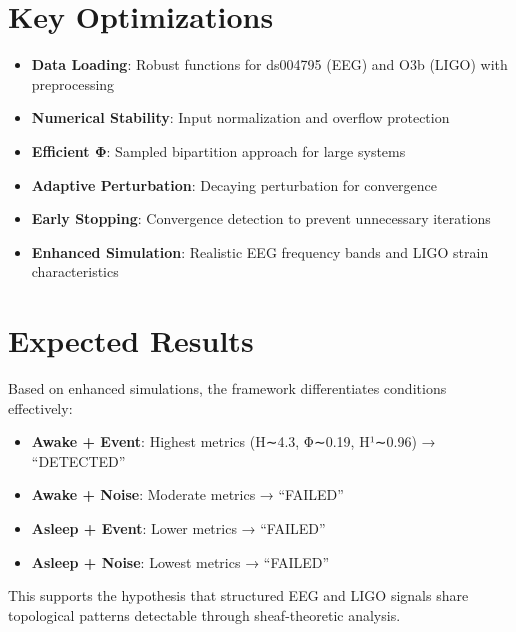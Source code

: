 \documentclass[11pt]{article}
\begin{document}
\section{Key Optimizations}

\begin{itemize}
\item \textbf{Data Loading}: Robust functions for ds004795 (EEG) and O3b (LIGO) with preprocessing
\item \textbf{Numerical Stability}: Input normalization and overflow protection
\item \textbf{Efficient Φ}: Sampled bipartition approach for large systems
\item \textbf{Adaptive Perturbation}: Decaying perturbation for convergence
\item \textbf{Early Stopping}: Convergence detection to prevent unnecessary iterations
\item \textbf{Enhanced Simulation}: Realistic EEG frequency bands and LIGO strain characteristics
\end{itemize}

\section{Expected Results}

Based on enhanced simulations, the framework differentiates conditions effectively:

\begin{itemize}
\item \textbf{Awake + Event}: Highest metrics (H∼4.3, Φ∼0.19, H¹∼0.96) → “DETECTED”
\item \textbf{Awake + Noise}: Moderate metrics → “FAILED”
\item \textbf{Asleep + Event}: Lower metrics → “FAILED”  
\item \textbf{Asleep + Noise}: Lowest metrics → “FAILED”
\end{itemize}

This supports the hypothesis that structured EEG and LIGO signals share topological patterns detectable through sheaf-theoretic analysis.
\end{document}

